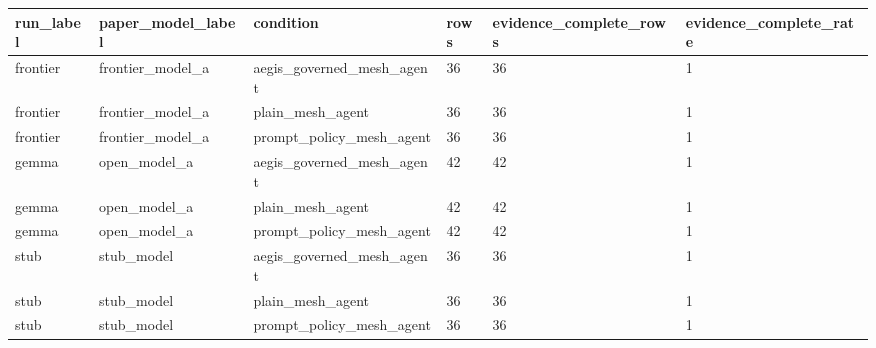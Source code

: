 \begin{tabular}{llllll}
 \hline
run\_label & paper\_model\_label & condition & rows & evidence\_complete\_rows & evidence\_complete\_rate \\
 \hline
frontier & frontier\_model\_a & aegis\_governed\_mesh\_agent & 36 & 36 & 1 \\
frontier & frontier\_model\_a & plain\_mesh\_agent & 36 & 36 & 1 \\
frontier & frontier\_model\_a & prompt\_policy\_mesh\_agent & 36 & 36 & 1 \\
gemma & open\_model\_a & aegis\_governed\_mesh\_agent & 42 & 42 & 1 \\
gemma & open\_model\_a & plain\_mesh\_agent & 42 & 42 & 1 \\
gemma & open\_model\_a & prompt\_policy\_mesh\_agent & 42 & 42 & 1 \\
stub & stub\_model & aegis\_governed\_mesh\_agent & 36 & 36 & 1 \\
stub & stub\_model & plain\_mesh\_agent & 36 & 36 & 1 \\
stub & stub\_model & prompt\_policy\_mesh\_agent & 36 & 36 & 1 \\
 \hline
\end{tabular}
